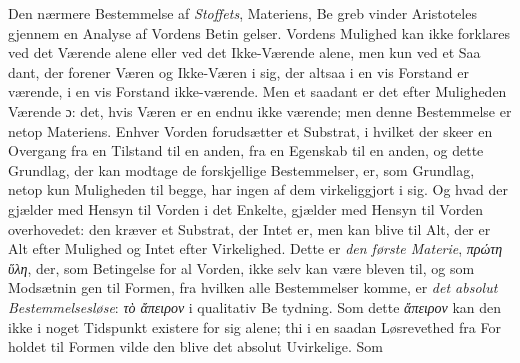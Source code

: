 \documentclass[12pt,a4paper]{book}
\newcommand{\gk}[1]{\textit{#1}}
\begin{document}
Den nærmere Bestemmelse af \emph{Stoffets}, Materiens, Be\-%
greb vinder Aristoteles gjennem en Analyse af Vordens Betin\-%
gelser. Vordens Mulighed kan ikke forklares ved det Værende
alene eller ved det Ikke-Værende alene, men kun ved et Saa\-%
dant, der forener Væren og Ikke-Væren i sig, der altsaa i en
vis Forstand er værende, i en vis Forstand ikke-værende.
Men et saadant er det efter Muligheden Værende ɔ: det, hvis
Væren er en endnu ikke værende; men denne Bestemmelse
er netop Materiens. Enhver Vorden forudsætter et Substrat,
i hvilket der skeer en Overgang fra en Tilstand til en anden,
fra en Egenskab til en anden, og dette Grundlag, der kan
modtage de forskjellige Bestemmelser, er, som Grundlag, netop
kun Muligheden til begge, har ingen af dem virkeliggjort i
sig. Og hvad der gjælder med Hensyn til Vorden i det
Enkelte, gjælder med Hensyn til Vorden overhovedet: den
kræver et Substrat, der Intet er, men kan blive til Alt,
der er Alt efter Mulighed og Intet efter Virkelighed. Dette
er \emph{den første Materie}, \gk{πρώτη ὕλη}, der, som Betingelse for
al Vorden, ikke selv kan være bleven til, og som Modsætnin\-%
gen til Formen, fra hvilken alle Bestemmelser komme, er \emph{det
absolut Bestemmelsesløse}: \gk{τὸ ἄπειρον} i qualitativ Be\-%
tydning. Som dette \gk{ἄπειρον} kan den ikke i noget Tidspunkt
existere for sig alene; thi i en saadan Løsrevethed fra For\-%
holdet til Formen vilde den blive det absolut Uvirkelige. Som
\end{document}

